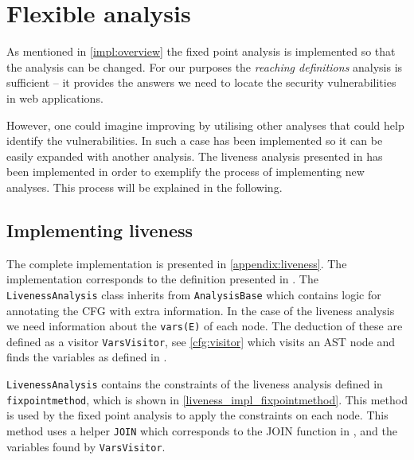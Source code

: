 \section{Flexible analysis}\label{impl:flexible}
As mentioned in \cref{impl:overview} the fixed point analysis is implemented so that the analysis can be changed.
For our purposes the \emph{reaching definitions} analysis is sufficient -- it provides the answers we need to locate the security vulnerabilities in web applications.

However, one could imagine improving \pyt{} by utilising other analyses that could help identify the vulnerabilities.
In such a case \pyt{} has been implemented so it can be easily expanded with another analysis.
The liveness analysis presented in \citet[p.~19]{schwartzbach} has been implemented in order to exemplify the process of implementing new analyses.
This process will be explained in the following.

\subsection{Implementing liveness}
The complete implementation is presented in \cref{appendix:liveness}.
The implementation corresponds to the definition presented in \citet[p.~20]{schwartzbach}.
The \texttt{LivenessAnalysis} class inherits from \texttt{AnalysisBase} which contains logic for annotating the CFG with extra information.
In the case of the liveness analysis we need information about the \texttt{vars(E)} of each node.
The deduction of these are defined as a visitor \texttt{VarsVisitor}, see \cref{cfg:visitor} which visits an AST node and finds the variables as defined in \citet{schwartzbach}.

\texttt{LivenessAnalysis} contains the constraints of the liveness analysis defined in \texttt{fixpointmethod}, which is shown in \cref{liveness_impl_fixpointmethod}.
This method is used by the fixed point analysis to apply the constraints on each node.
This method uses a helper \texttt{JOIN} which corresponds to the JOIN function in \citet{schwartzbach}, and the variables found by \texttt{VarsVisitor}.

